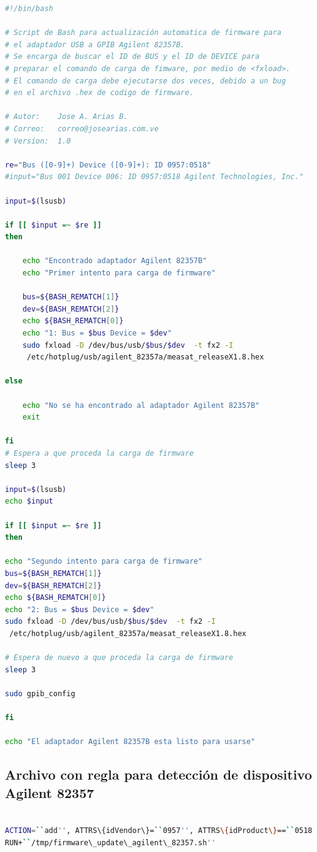 \documentclass[paper=letter,oneside,fontsize=11pt, parskip=full]{scrartcl}
\begin{document}
	\begin{lstlisting}[language=bash,caption={firmware\_update\_agilent\_82357.sh}]
#!/bin/bash 

# Script de Bash para actualización automatica de firmware para 
# el adaptador USB a GPIB Agilent 82357B.
# Se encarga de buscar el ID de BUS y el ID de DEVICE para 
# preparar el comando de carga de fimware, por medio de <fxload>. 
# El comando de carga debe ejecutarse dos veces, debido a un bug 
# en el archivo .hex de codigo de firmware.

# Autor: 	Jose A. Arias B.
# Correo: 	correo@josearias.com.ve
# Version:	1.0

re="Bus ([0-9]+) Device ([0-9]+): ID 0957:0518"
#input="Bus 001 Device 006: ID 0957:0518 Agilent Technologies, Inc."

input=$(lsusb)

if [[ $input =~ $re ]] 
then 

	echo "Encontrado adaptador Agilent 82357B"
	echo "Primer intento para carga de firmware"

	bus=${BASH_REMATCH[1]}
	dev=${BASH_REMATCH[2]}
	echo ${BASH_REMATCH[0]}
	echo "1: Bus = $bus Device = $dev"
	sudo fxload -D /dev/bus/usb/$bus/$dev  -t fx2 -I 
	 /etc/hotplug/usb/agilent_82357a/measat_releaseX1.8.hex

else 

	echo "No se ha encontrado al adaptador Agilent 82357B"
	exit

fi
# Espera a que proceda la carga de firmware
sleep 3

input=$(lsusb)
echo $input

if [[ $input =~ $re ]]
then

echo "Segundo intento para carga de firmware"
bus=${BASH_REMATCH[1]}
dev=${BASH_REMATCH[2]}
echo ${BASH_REMATCH[0]}
echo "2: Bus = $bus Device = $dev"
sudo fxload -D /dev/bus/usb/$bus/$dev  -t fx2 -I
 /etc/hotplug/usb/agilent_82357a/measat_releaseX1.8.hex

# Espera de nuevo a que proceda la carga de firmware
sleep 3

sudo gpib_config

fi

echo "El adaptador Agilent 82357B esta listo para usarse"
	\end{lstlisting}	
	
	\subsection{Archivo con regla para detección de dispositivo Agilent 82357}

	\begin{lstlisting}[language=bash,caption={agilent\_82357.rules}]
	
ACTION=``add'', ATTRS\{idVendor\}=``0957'', ATTRS\{idProduct\}==``0518'', 
RUN+``/tmp/firmware\_update\_agilent\_82357.sh''
	
	\end{lstlisting}
		
\end{document}
